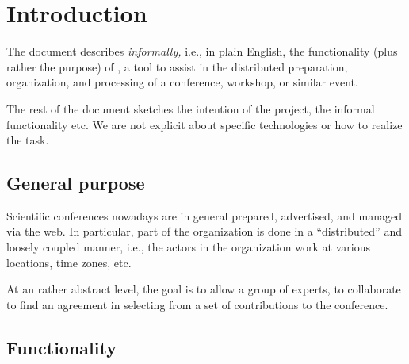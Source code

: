 \section{Introduction}
\label{sec:introduction}




The document describes \emph{informally,} i.e., in plain English, the
functionality (plus rather the purpose) of \Coma, a tool to assist in the
distributed preparation, organization, and processing of a conference,
workshop, or similar event.

The rest of the document sketches the intention of the project, the
informal functionality etc. We are not explicit about specific technologies
or how to realize the task.


\iffalse

As we intend to start \emph{early} with the \emph{integration}, the
required methods should be provided rather quickly without being (fully)
implemented (i.e., as \textit{stubs}). See also the time-line of the
project.

We provide as starting point a first implementation of the abstract syntax
(cf.\ Section~\ref{sec:abstractsyntax}) and a small textual printer in the
utilities package.



If from the perspective of a package, changes or extensions seem necessary
or desirable as far as the abstract syntax is concerned, the wish should be
uttered and justified as early as possible to all participants (and then
potentially implemented by us or the requester, if everyone agrees).

\fi




\subsection{General purpose}
\label{sec:purpose}

Scientific conferences nowadays are in general prepared, advertised, and
managed via the web. In particular, part of the organization is done in a
``distributed'' and loosely coupled manner, i.e., the actors in the
organization work at various locations, time zones, etc.

At an rather abstract level, the goal is to allow a group of experts, to
collaborate to find an agreement in selecting from a set of contributions
to the conference.



\subsection{Functionality}

